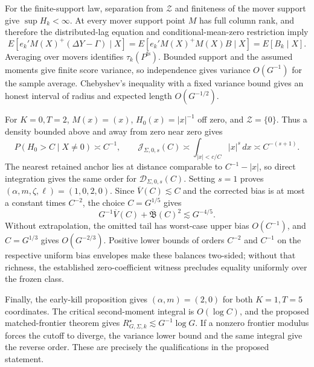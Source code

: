 For the finite-support law, separation from \(\mathcal Z\) and finiteness of the mover support give \(\sup H_k<\infty\). At every mover support point \(M\) has full column rank, and therefore the distributed-lag equation and conditional-mean-zero restriction imply
\[
E[e_k'M(X)^+(\Delta Y-\Gamma)\mid X]
=E[e_k'M(X)^+M(X)B\mid X]
=E[B_k\mid X].
\]
Averaging over movers identifies \(\tau_k(P^{\mathrm{fs}})\). Bounded support and the assumed moments give finite score variance, so independence gives variance \(O(G^{-1})\) for the sample average. Chebyshev's inequality with a fixed variance bound gives an honest interval of radius and expected length \(O(G^{-1/2})\).

For \(K=0,T=2\), \(M(x)=(x)\), \(H_0(x)=|x|^{-1}\) off zero, and \(\mathcal Z=\{0\}\). Thus a density bounded above and away from zero near zero gives
\[
P(H_0>C\mid X\ne0)\asymp C^{-1},
\qquad
\mathcal J_{\Sigma,0,s}(C)
\asymp\int_{|x|<c/C}|x|^s\,dx
\asymp C^{-(s+1)}.
\]
The nearest retained anchor lies at distance comparable to \(C^{-1}-|x|\), so direct integration gives the same order for \(\mathcal D_{\Sigma,0,s}(C)\). Setting \(s=1\) proves \((\alpha,m,\zeta,\ell)=(1,0,2,0)\). Since \(\overline V(C)\lesssim C\) and the corrected bias is at most a constant times \(C^{-2}\), the choice \(C=G^{1/5}\) gives
\[
G^{-1}\overline V(C)+\overline{\mathfrak B}(C)^2
\lesssim G^{-4/5}.
\]
Without extrapolation, the omitted tail has worst-case upper bias \(O(C^{-1})\), and \(C=G^{1/3}\) gives \(O(G^{-2/3})\). Positive lower bounds of orders \(C^{-2}\) and \(C^{-1}\) on the respective uniform bias envelopes make these balances two-sided; without that richness, the established zero-coefficient witness precludes equality uniformly over the frozen class.

Finally, the early-kill proposition gives \((\alpha,m)=(2,0)\) for both \(K=1,T=5\) coordinates. The critical second-moment integral is \(O(\log C)\), and the proposed matched-frontier theorem gives \(R_{G,\Sigma,k}^{\star}\lesssim G^{-1}\log G\). If a nonzero frontier modulus forces the cutoff to diverge, the variance lower bound and the same integral give the reverse order. These are precisely the qualifications in the proposed statement.